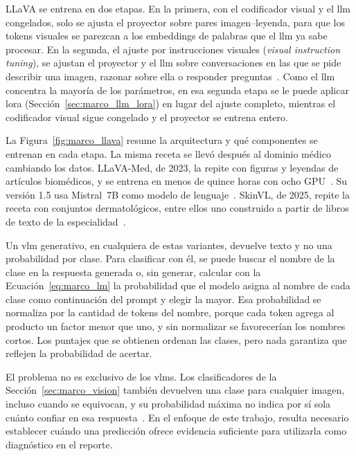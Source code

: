 LLaVA se entrena en dos etapas. En la primera, con el codificador visual y el \gls{llm} congelados, solo se
ajusta el proyector sobre pares imagen--leyenda, para que los tokens visuales se parezcan a los embeddings de
palabras que el \gls{llm} ya sabe procesar. En la segunda, el ajuste por instrucciones visuales (\emph{visual
instruction tuning}), se ajustan el proyector y el \gls{llm} sobre conversaciones en las que se pide describir
una imagen, razonar sobre ella o responder preguntas~\cite{liu2023visual}. Como el \gls{llm} concentra la
mayoría de los parámetros, en esa segunda etapa se le puede aplicar \gls{lora}
(Sección~\ref{sec:marco_llm_lora}) en lugar del ajuste completo, mientras el codificador visual sigue congelado
y el proyector se entrena entero.



La Figura~\ref{fig:marco_llava} resume la arquitectura y qué componentes se entrenan en cada etapa. La misma
receta se llevó después al dominio médico cambiando los datos. LLaVA-Med, de 2023, la repite con
figuras y leyendas de artículos biomédicos, y se entrena en menos de quince horas con ocho
GPU~\cite{li2023llavamed}. Su versión 1.5 usa Mistral~7B como modelo de lenguaje~\cite{jiang2023mistral,zeng2025mmskin}. SkinVL,
de 2025, repite la receta con conjuntos dermatológicos, entre ellos uno construido a partir de libros de texto de
la especialidad~\cite{zeng2025mmskin}.

Un \gls{vlm} generativo, en cualquiera de estas variantes, devuelve texto y no una probabilidad por clase. Para
clasificar con él, se puede buscar el nombre de la clase en la respuesta generada o, sin generar, calcular con la
Ecuación~\ref{eq:marco_lm} la probabilidad que el modelo asigna al nombre de cada clase como continuación del
prompt y elegir la mayor. Esa probabilidad se normaliza por la cantidad de tokens del nombre, porque cada token
agrega al producto un factor menor que uno, y sin normalizar se favorecerían los nombres cortos. Los puntajes
que se obtienen ordenan las clases, pero nada garantiza que reflejen la probabilidad de acertar.

El problema no es exclusivo de los \glspl{vlm}. Los clasificadores de la Sección~\ref{sec:marco_vision} también
devuelven una clase para cualquier imagen, incluso cuando se equivocan, y su probabilidad máxima no indica por sí
sola cuánto confiar en esa respuesta~\cite{guo2017calibration}. En el enfoque de este trabajo, resulta necesario establecer cuándo una predicción ofrece evidencia suficiente para utilizarla como diagnóstico en el reporte.

